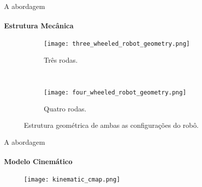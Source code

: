 \begin{frame}[c]{A abordagem}
  \framesubtitle{Estrutura Mecânica}
  \transdissolve[duration=0.5]

  \begin{figure}[ht!]
    \centering
    \begin{subfigure}[b]{0.38\textwidth}
      \texttt{[image: three\_wheeled\_robot\_geometry.png]}
      \caption{Três rodas.}
      \label{fig:3_wheels_robot_geometry}
    \end{subfigure}
    ~
    \begin{subfigure}[b]{0.38\textwidth}
      \texttt{[image: four\_wheeled\_robot\_geometry.png]}
      \caption{Quatro rodas.}
      \label{fig:4_wheels_robot_geometry}
    \end{subfigure}
    
    \caption{Estrutura geométrica de ambas as configurações do robô. \cite{Oliveira2008}}
  \end{figure}


\end{frame}

\begin{frame}[c]{A abordagem}
  \framesubtitle{Modelo Cinemático}
  \transdissolve[duration=0.5]

  \begin{figure}[ht!]
    \centering

    \texttt{[image: kinematic\_cmap.png]}
    \label{fig:kinematic_cmap}

  \end{figure}


\end{frame}

